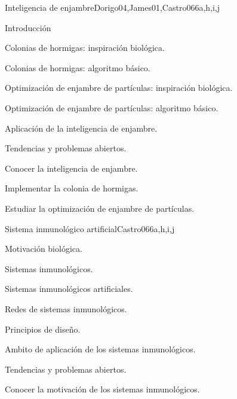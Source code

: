 \begin{syllabus}
\begin{unit}{Inteligencia de enjambre}{Dorigo04,James01,Castro06}{6}{a,h,i,j}
\begin{topics}
        \item Introducción
        \item Colonias de hormigas: inspiración biológica.
        \item Colonias de hormigas: algoritmo básico.
        \item Optimización de enjambre de partículas: inspiración biológica.
        \item Optimización de enjambre de partículas: algoritmo básico.
        \item Aplicación de la inteligencia de enjambre.
        \item Tendencias y problemas abiertos.
    \end{topics}
    \begin{unitgoals}
        \item Conocer la inteligencia de enjambre.
        \item Implementar la colonia de hormigas.
        \item Estudiar la optimización de enjambre de partículas.
    \end{unitgoals}
\end{unit}

\begin{unit}{Sistema inmunológico artificial}{Castro06}{6}{a,h,i,j}
\begin{topics}
        \item Motivación biológica.
        \item Sistemas inmunológicos.
        \item Sistemas inmunológicos artificiales.
        \item Redes de sistemas inmunológicos.
        \item Principios de diseño.
        \item Ambito de aplicación de los sistemas inmunológicos.
        \item Tendencias y problemas abiertos.
    \end{topics}
    \begin{unitgoals}
        \item Conocer la motivación de los sistemas inmunológicos.
    \end{unitgoals}
\end{unit}


\end{syllabus}
